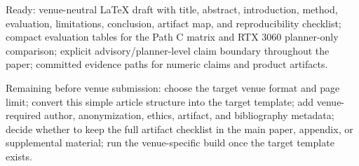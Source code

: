 \documentclass[11pt]{article}
\begin{document}
Ready: venue-neutral LaTeX draft with title, abstract, introduction, method,
evaluation, limitations, conclusion, artifact map, and reproducibility
checklist; compact evaluation tables for the Path C matrix and RTX 3060
planner-only comparison; explicit advisory/planner-level claim boundary
throughout the paper; committed evidence paths for numeric claims and product
artifacts.

Remaining before venue submission: choose the target venue format and page
limit; convert this simple article structure into the target template; add
venue-required author, anonymization, ethics, artifact, and bibliography
metadata; decide whether to keep the full artifact checklist in the main paper,
appendix, or supplemental material; run the venue-specific build once the
target template exists.



\end{document}

